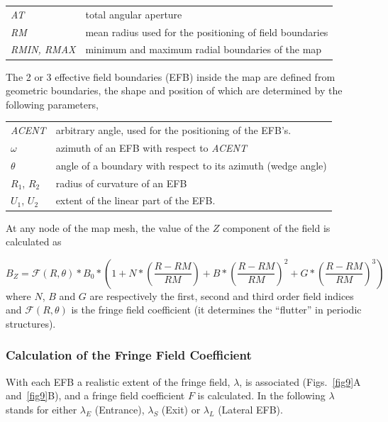  \begin{tabular}{>{\sl}l!{~:}l}
	 AT &  total angular aperture\\
	 RM & mean radius used for the positioning of field boundaries\\
	 RMIN, RMAX
	    &  minimum and maximum radial boundaries of the map 
 \end{tabular}
\bigskip

\noindent The 2 or 3 effective field boundaries (EFB) inside the map are
defined from  geometric boundaries, the shape and position of which are determined by the 
following parameters, 


\begin{tabular}{l!{~:}l}
	 \textsl{ACENT} 
	    & arbitrary  angle, used for the positioning of the EFB's. \\
	$\omega$ &  azimuth of an EFB with respect to  \textsl{ACENT}\\
	$\theta$ & angle of a boundary with respect to its azimuth (wedge angle)\\ 
	$R_1$, $R_2$  &  radius of curvature of an EFB\\
	$U_1$, $U_2$  &  extent of the linear part of the EFB. 
\end{tabular}
\bigskip

\noindent At  any node  of the map mesh, the value of the $Z$ 
component of the field is calculated as 

 \begin{equation}
	 B_Z =  \mathcal{F}(R,\theta) \ast  B_0 \ast  
	      \left(1+N \ast  
	           \left( \dfrac{R-RM }{ RM}\right) 
	           + B \ast  \left(\dfrac{R-RM }{ RM} \right)^2 
	           + G \ast  \left(\dfrac{R-RM }{ RM} \right)^3 
	      \right) 
 	\label{eq4-4-1}
 \end{equation}
%
 where  $ N$, $B $ and $ G $ are  respectively  the first, second and
third order field indices and $ \mathcal{F}(R,\theta)$ is the fringe field 
coefficient  (it determines the ``flutter''  in periodic structures).  


\subsubsection*{Calculation of the Fringe Field Coefficient} 

With  each EFB a realistic extent of the fringe field, $\lambda$, 
is associated (Figs.~\ref{fig9}A and~\ref{fig9}B),  
and a fringe field coefficient $ F$ is 
calculated. In the following $\lambda$ stands for either $ \lambda_ E $
(Entrance), $ \lambda_ S $ (Exit) or $ \lambda_ L $ (Lateral EFB). 
 
